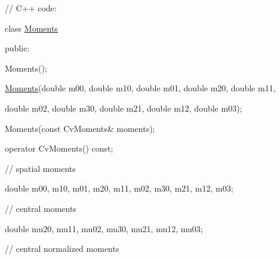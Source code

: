 {\ttfamily }

{\ttfamily }

{\ttfamily // C++ code\+:}

{\ttfamily }

{\ttfamily }

{\ttfamily class \mbox{\hyperlink{classorg_1_1opencv_1_1imgproc_1_1_moments}{Moments}}}

{\ttfamily }

{\ttfamily }

{\ttfamily public\+:}

{\ttfamily }

{\ttfamily }

{\ttfamily Moments();}

{\ttfamily }

{\ttfamily }

{\ttfamily \mbox{\hyperlink{classorg_1_1opencv_1_1imgproc_1_1_moments}{Moments}}(double m00, double m10, double m01, double m20, double m11,}

{\ttfamily }

{\ttfamily }

{\ttfamily double m02, double m30, double m21, double m12, double m03);}

{\ttfamily }

{\ttfamily }

{\ttfamily Moments(const Cv\+Moments\& moments);}

{\ttfamily }

{\ttfamily }

{\ttfamily operator Cv\+Moments() const;}

{\ttfamily }

{\ttfamily }

{\ttfamily // spatial moments}

{\ttfamily }

{\ttfamily }

{\ttfamily double m00, m10, m01, m20, m11, m02, m30, m21, m12, m03;}

{\ttfamily }

{\ttfamily }

{\ttfamily // central moments}

{\ttfamily }

{\ttfamily }

{\ttfamily double mu20, mu11, mu02, mu30, mu21, mu12, mu03;}

{\ttfamily }

{\ttfamily }

{\ttfamily // central normalized moments}

